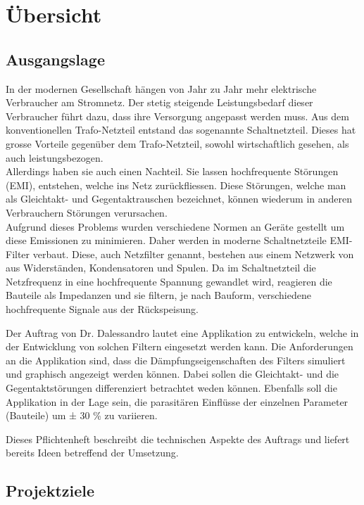 \section{Übersicht} \label{sec:uebersicht}
\subsection{Ausgangslage}

In der modernen Gesellschaft hängen von Jahr zu Jahr mehr elektrische Verbraucher am Stromnetz. Der stetig steigende Leistungsbedarf dieser Verbraucher führt dazu, dass ihre Versorgung angepasst werden muss. Aus dem konventionellen Trafo-Netzteil entstand das sogenannte Schaltnetzteil. Dieses hat grosse Vorteile gegenüber dem Trafo-Netzteil, sowohl wirtschaftlich gesehen, als auch leistungsbezogen. \\Allerdings haben sie auch einen Nachteil. Sie lassen hochfrequente Störungen (EMI), entstehen, welche ins Netz zurückfliessen. Diese Störungen, welche man als Gleichtakt- und Gegentaktrauschen bezeichnet, können wiederum in anderen Verbrauchern  Störungen verursachen. \\Aufgrund dieses Problems wurden verschiedene Normen an Geräte gestellt um diese Emissionen zu minimieren. Daher werden in moderne Schaltnetzteile EMI-Filter verbaut.  Diese, auch Netzfilter genannt, bestehen aus einem Netzwerk von  aus Widerständen, Kondensatoren und Spulen. Da im Schaltnetzteil die Netzfrequenz in eine hochfrequente Spannung gewandlet wird, reagieren die Bauteile als Impedanzen und sie filtern, je nach Bauform, verschiedene hochfrequente Signale aus der Rückspeisung.


Der Auftrag von Dr. Dalessandro lautet eine Applikation zu entwickeln, welche in der Entwicklung von solchen Filtern eingesetzt werden kann. Die Anforderungen an die Applikation sind, dass die Dämpfungseigenschaften des Filters simuliert und graphisch angezeigt werden können. Dabei sollen die Gleichtakt- und die Gegentaktstörungen differenziert betrachtet weden können. Ebenfalls soll die Applikation in der Lage sein, die parasitären Einflüsse der einzelnen Parameter (Bauteile) um ± 30 \% zu variieren.   


Dieses Pflichtenheft beschreibt die technischen Aspekte des Auftrags und liefert bereits Ideen betreffend der Umsetzung. 
 

\newpage
\subsection{Projektziele} \label{subsec:projektziele}


